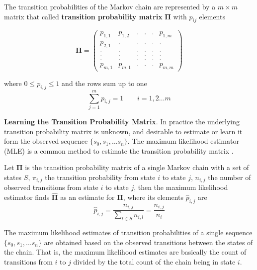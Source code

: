 The transition probabilities of the Markov chain are represented by a $m \times m$ matrix that called \textbf{transition probability matrix} $\boldsymbol{\Pi}$ with $p_{ij}$ elements


\begin{equation}
\label{eq:matrix_example}
\boldsymbol{\Pi} = 
\begin{pmatrix} 
p_{1,1}	   &p_{1,2}  &. 		&. 		& . &  	p_{1,m} \\
p_{2,1}		   &.  & .		& .	    & .	& . \\
. 		   &.  & .		& .	    & .	& . \\
.		   &.  & .		& .		& .	& . \\
.		   &.  & .		& .		& .	& .\\
p_{m,1}	   & p_{m,1}	&.		& .	& .	&p_{m,m}
\end{pmatrix}
\end{equation}

where $0 \leq p_{i,j}\leq 1 $ and the rows sum up to one 
\begin{equation}
\sum_{j=1}^{m} p_{i,j}= 1\ \ \ \ \ \ \ \ \ i=1,2 \ldots m
\end{equation}

\textbf{Learning the Transition Probability Matrix}. In practice the underlying  transition probability matrix is unknown, and desirable to estimate or learn it form the observed sequence $\{s_0, s_1, \ldots s_n\}$. The maximum likelihood estimator (MLE) is a common method to estimate the transition probability matrix \cite{anderson1957statistical}.


\begin{definition}
	Let $\boldsymbol{\Pi}$ is the transition probability matrix of a single Markov chain with a set of states $S$, 
	$\pi_{i,j}$ the transition probability from state $i$ to state $j$,
	$n_{i,j}$ the number of observed transitions from state $i$ to state $j$,
	then the maximum likelihood estimator finds $\boldsymbol{\hat{\Pi}}$ as an estimate for $\boldsymbol{\Pi}$, where its elements $\hat{p}_{i,j}$ are
	\begin{equation}
	\label{eq:pi_estim}
	\hat{p}_{i,j}=\frac{n_{i,j}}{\sum_{l \in S} n_{i,l}}=\frac{n_{i,j}}{n_{i}}
	\end{equation}
	
\end{definition} 


	The maximum likelihood estimates of transition probabilities of a single sequence $\{s_0, s_1, \ldots s_n\}$   are obtained based on the observed transitions between the states of the chain. That is, the maximum likelihood estimates are basically the count of transitions from $i$ to $j$ divided by the total count of the chain being in state $i$.  
	
